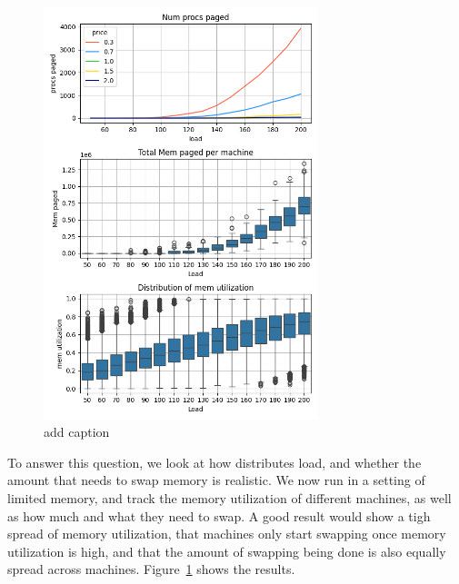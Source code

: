 \begin{figure}[t!]
    \centering
      \includegraphics[width=8cm]{img/memory_graphs.png}
      \caption{ add caption }
    \label{fig:memory-graphs}
\end{figure}

To answer this question, we look at how \sys{} distributes load, and whether the
amount that \sys{} needs to swap memory is realistic. We now run \sys{} in a
setting of limited memory, and track the memory utilization of different
machines, as well as how much and what they need to swap. A good result would
show a tigh spread of memory utilization, that machines only start swapping once
memory utilization is high, and that the amount of swapping being done is also
equally spread across machines. Figure~\ref{fig:memory-graphs} shows the
results.



